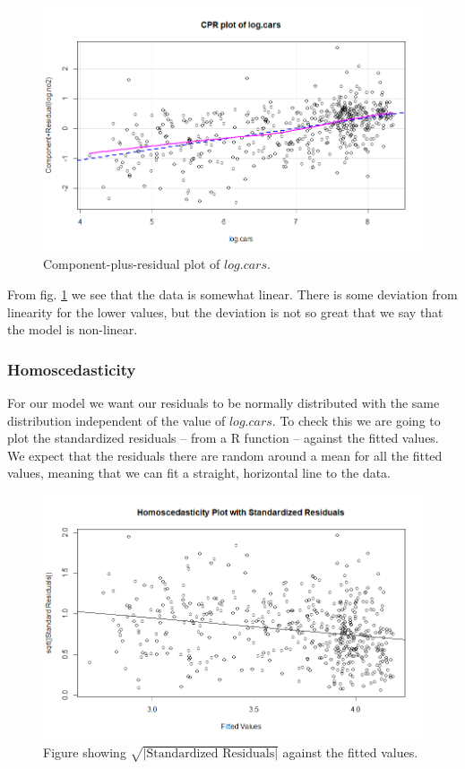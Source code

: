 \documentclass[a4paper,norsk, 10pt]{article}
\begin{document}
\begin{figure}[!htbp]
\centering
\includegraphics[scale=0.5]{cpr_cars.png}
\caption{Component-plus-residual plot of $log.cars$.}\label{fig:cpr}
\end{figure}

From fig. \ref{fig:cpr} we see that the data is somewhat linear. There is some deviation from linearity for the lower values, but  the deviation is not so great that we say that the model is non-linear.


\subsubsection*{Homoscedasticity}
For our model we want our residuals to be normally distributed with the same distribution independent of the value of $log.cars$. To check this we are going to plot the standardized residuals -- from a R function -- against the fitted values. We expect that the residuals there are random around a mean for all the fitted values, meaning that we can fit a straight, horizontal line  to the data. 
	
\begin{figure}[!htbp]
\centering
\includegraphics[scale=0.5]{stand_res.png}
\caption{Figure showing $\sqrt{|\text{Standardized Residuals}|}$ against the fitted values.}\label{fig:stand_res}
\end{figure}
\end{document}
